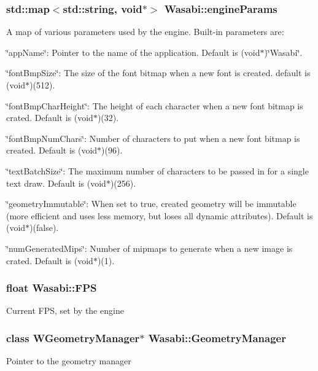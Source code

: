\subsubsection[{\texorpdfstring{engine\+Params}{engineParams}}]{\setlength{\rightskip}{0pt plus 5cm}std\+::map$<$std\+::string, void$\ast$$>$ Wasabi\+::engine\+Params}\hypertarget{class_wasabi_ab3d3e87ba206b4184b504c1666ff6dc3}{}\label{class_wasabi_ab3d3e87ba206b4184b504c1666ff6dc3}
A map of various parameters used by the engine. Built-\/in parameters are\+:
\begin{DoxyItemize}
\item \char`\"{}app\+Name\char`\"{}\+: Pointer to the name of the application. Default is (void$\ast$)\char`\"{}\+Wasabi\char`\"{}.
\item \char`\"{}font\+Bmp\+Size\char`\"{}\+: The size of the font bitmap when a new font is created. default is (void$\ast$)(512).
\item \char`\"{}font\+Bmp\+Char\+Height\char`\"{}\+: The height of each character when a new font bitmap is crated. Default is (void$\ast$)(32).
\item \char`\"{}font\+Bmp\+Num\+Chars\char`\"{}\+: Number of characters to put when a new font bitmap is created. Default is (void$\ast$)(96).
\item \char`\"{}text\+Batch\+Size\char`\"{}\+: The maximum number of characters to be passed in for a single text draw. Default is (void$\ast$)(256).
\item \char`\"{}geometry\+Immutable\char`\"{}\+: When set to true, created geometry will be immutable (more efficient and uses less memory, but loses all dynamic attributes). Default is (void$\ast$)(false).
\item \char`\"{}num\+Generated\+Mips\char`\"{}\+: Number of mipmaps to generate when a new image is crated. Default is (void$\ast$)(1). 
\end{DoxyItemize}
\subsubsection[{\texorpdfstring{F\+PS}{FPS}}]{\setlength{\rightskip}{0pt plus 5cm}float Wasabi\+::\+F\+PS}\hypertarget{class_wasabi_a28397bc5824cf3f18fa1363a3347a5d1}{}\label{class_wasabi_a28397bc5824cf3f18fa1363a3347a5d1}
Current F\+PS, set by the engine 
\subsubsection[{\texorpdfstring{Geometry\+Manager}{GeometryManager}}]{\setlength{\rightskip}{0pt plus 5cm}class {\bf W\+Geometry\+Manager}$\ast$ Wasabi\+::\+Geometry\+Manager}\hypertarget{class_wasabi_a81f731818d4ba54bea255b0d0fab03b8}{}\label{class_wasabi_a81f731818d4ba54bea255b0d0fab03b8}
Pointer to the geometry manager 
